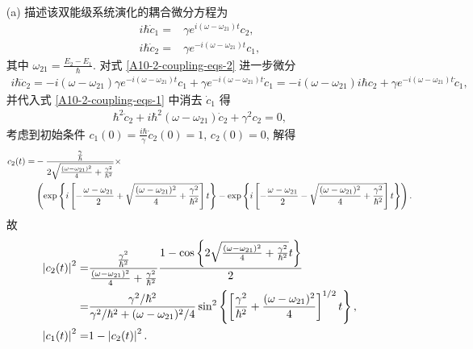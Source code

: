 \documentclass{assignment}
\begin{document}
\begin{sol}
    \begin{itemize}
        \item[(a)] 描述该双能级系统演化的耦合微分方程为
        \begin{align}
            \label{A10-2-coupling-eqs-1}
            i\hbar\dot{c}_1=&\gamma e^{i(\omega-\omega_{21})t}c_2,\\
            \label{A10-2-coupling-eqs-2}
            i\hbar\dot{c}_2=&\gamma e^{-i(\omega-\omega_{21})t}c_1,
        \end{align}
        其中 $\omega_{21}=\frac{E_2-E_1}{\hbar}$. 对式 \eqref{A10-2-coupling-eqs-2} 进一步微分
        \begin{align}
            i\hbar\ddot{c}_2=-i(\omega-\omega_{21})\gamma e^{-i(\omega-\omega_{21})t}c_1+\gamma e^{-i(\omega-\omega_{21})t}\dot{c}_1=-i(\omega-\omega_{21})i\hbar c_2+\gamma e^{-i(\omega-\omega_{21})t}\dot{c}_1,
        \end{align}
        并代入式 \eqref{A10-2-coupling-eqs-1} 中消去 $\dot{c}_1$ 得
        \begin{align}
            \hbar^2\ddot{c}_2+i\hbar^2(\omega-\omega_{21})\dot{c}_2+\gamma^2c_2=0,
        \end{align}
        考虑到初始条件 $c_1(0)=\frac{i\hbar}{\gamma}\dot{c}_2(0)=1$, $c_2(0)=0$, 解得
        \begin{align}
            \notag c_2(t)=&-\frac{\frac{\gamma}{\hbar}}{2\sqrt{\frac{(\omega-\omega_{21})^2}{4}+\frac{\gamma^2}{\hbar^2}}}\times\\
            &\left(\exp\left\{i\left[-\frac{\omega-\omega_{21}}{2}+\sqrt{\frac{(\omega-\omega_{21})^2}{4}+\frac{\gamma^2}{\hbar^2}}\right]t\right\}-\exp\left\{i\left[-\frac{\omega-\omega_{21}}{2}-\sqrt{\frac{(\omega-\omega_{21})^2}{4}+\frac{\gamma^2}{\hbar^2}}\right]t\right\}\right).
        \end{align}
        故
        \begin{align}
            \notag\left\lvert c_2(t)\right\rvert^2=&\frac{\frac{\gamma^2}{\hbar^2}}{\frac{(\omega-\omega_{21})^2}{4}+\frac{\gamma^2}{\hbar^2}}\frac{1-\cos\left\{2\sqrt{\frac{(\omega-\omega_{21})^2}{4}+\frac{\gamma^2}{\hbar^2}}t\right\}}{2}\\
            =&\frac{\gamma^2/\hbar^2}{\gamma^2/\hbar^2+(\omega-\omega_{21})^2/4}\sin^2\left\{\left[\frac{\gamma^2}{\hbar^2}+\frac{(\omega-\omega_{21})^2}{4}\right]^{1/2}t\right\},\\
            \left\lvert c_1(t)\right\rvert^2=&1-\left\lvert c_2(t)\right\rvert^2.
        \end{align}

\end{itemize}
\end{sol}
\end{document}
